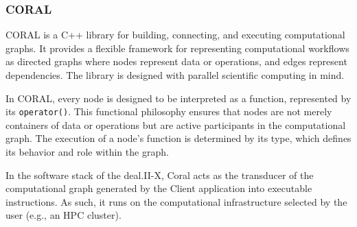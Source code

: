 \documentclass[a4paper,12pt]{article}
\begin{document}
\subsubsection{CORAL}

CORAL is a C++ library for building, connecting, and executing computational graphs. It provides a flexible framework for representing computational workflows as directed graphs where nodes represent data or operations, and edges represent dependencies. The library is designed with parallel scientific computing in mind.

In CORAL, every node is designed to be interpreted as a function, represented by its \texttt{operator()}. This functional philosophy ensures that nodes are not merely containers of data or operations but are active participants in the computational graph. The execution of a node's function is determined by its type, which defines its behavior and role within the graph.

In the software stack of the deal.II-X, Coral acts as the transducer of the computational graph generated by the Client application into executable instructions. As such, it runs on the computational infrastructure selected by the user (e.g., an HPC cluster).
\end{document}
